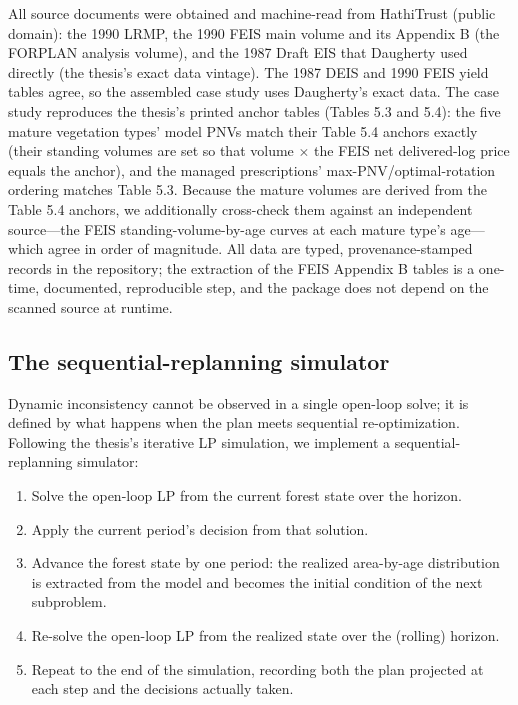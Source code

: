 \documentclass[12pt]{article}
\providecommand{\tightlist}{\setlength{\itemsep}{0pt}\setlength{\parskip}{0pt}}
\begin{document}
All source documents were obtained and machine-read from HathiTrust (public domain): the 1990 LRMP, the 1990 FEIS main volume and its Appendix B (the FORPLAN analysis volume), and the 1987 Draft EIS \citep{usda1987umpqua} that Daugherty used directly (the thesis's exact data vintage). The 1987 DEIS and 1990 FEIS yield tables agree, so the assembled case study uses Daugherty's exact data. The case study reproduces the thesis's printed anchor tables (Tables 5.3 and 5.4): the five mature vegetation types' model PNVs match their Table 5.4 anchors exactly (their standing volumes are set so that volume $\times$ the FEIS net delivered-log price equals the anchor), and the managed prescriptions' max-PNV/optimal-rotation ordering matches Table 5.3. Because the mature volumes are derived from the Table 5.4 anchors, we additionally cross-check them against an independent source---the FEIS standing-volume-by-age curves at each mature type's age---which agree in order of magnitude. All data are typed, provenance-stamped records in the repository; the extraction of the FEIS Appendix B tables is a one-time, documented, reproducible step, and the package does not depend on the scanned source at runtime.

\hypertarget{the-sequential-replanning-simulator}{%
\subsection{The sequential-replanning simulator}\label{the-sequential-replanning-simulator}}

Dynamic inconsistency cannot be observed in a single open-loop solve; it is defined by what happens when the plan meets sequential re-optimization. Following the thesis's iterative LP simulation, we implement a sequential-replanning simulator:

\begin{enumerate}
\def\labelenumi{\arabic{enumi}.}
\tightlist
\item
  Solve the open-loop LP from the current forest state over the horizon.
\item
  Apply the current period's decision from that solution.
\item
  Advance the forest state by one period: the realized area-by-age distribution is extracted from the model and becomes the initial condition of the next subproblem.
\item
  Re-solve the open-loop LP from the realized state over the (rolling) horizon.
\item
  Repeat to the end of the simulation, recording both the plan projected at each step and the decisions actually taken.
\end{enumerate}
\end{document}
